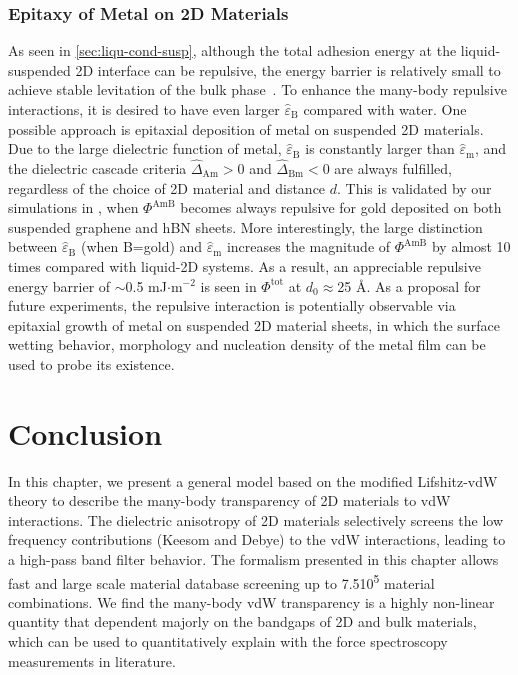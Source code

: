 \subsubsection{Epitaxy of Metal on 2D Materials}
\label{sec:epitaxy-metal-2d}

As seen in \autoref{sec:liqu-cond-susp}, although the total adhesion
energy at the liquid-suspended 2D interface can be repulsive, the
energy barrier is relatively small to achieve stable levitation of the
bulk phase~\cite{Zhao_2019_casimir_trap}.
%
To enhance the many-body repulsive interactions, it is desired to have
even larger $\hat{\varepsilon}_{\mathrm{B}}$ compared with water. One
possible approach is epitaxial deposition of metal on suspended 2D
materials.
%
Due to the large dielectric function of metal,
$\hat{\varepsilon}_{\mathrm{B}}$ is constantly larger than
$\hat{\varepsilon}_{\mathrm{m}}$, and the dielectric cascade criteria
$\hat{\Delta}_{\mathrm{Am}} > 0$ and $\hat{\Delta}_{\mathrm{Bm}} < 0$
are always fulfilled, regardless of the choice of 2D material and
distance $d$.
%
This is validated by our simulations in , when
$\Phi^{\mathrm{AmB}}$ becomes always repulsive for gold deposited on
both suspended graphene and hBN sheets.
%
More interestingly, the large distinction between
$\hat{\varepsilon}_{\mathrm{B}}$ (when B=gold) and
$\hat{\varepsilon}_{\mathrm{m}}$ 
increases the magnitude of $\Phi^{\mathrm{AmB}}$ by almost 10 times
compared with liquid-2D systems. As a result, an appreciable repulsive
energy barrier of $\sim{}$0.5 mJ$\cdot$m$^{-2}$ is seen in
$\Phi^{\mathrm{tot}}$ at $d_{0} \approx$25 \AA{}.
%
%
As a proposal for future experiments, the repulsive interaction is
potentially observable via epitaxial growth of metal on suspended 2D
material sheets, in which the surface wetting behavior, morphology and
nucleation density of the metal film can be used to probe its
existence.



\section{Conclusion}
\label{sec:vdw-conclusion}

In this chapter, we present a general model based on the modified
Lifshitz-vdW theory to describe the many-body transparency of 2D materials
to vdW interactions.
%
The dielectric anisotropy of 2D materials selectively screens the 
low frequency contributions (Keesom and Debye) to the vdW interactions, leading to a high-pass band filter behavior.
%
The formalism presented in this chapter allows fast and large scale
material database screening up to 7.5\texttimes{}10\textsuperscript{5}
material combinations.
%
We find the many-body vdW transparency is a highly non-linear quantity
that dependent majorly on the bandgaps of 2D and bulk materials, which
can be used to quantitatively explain with the force spectroscopy measurements in literature.

